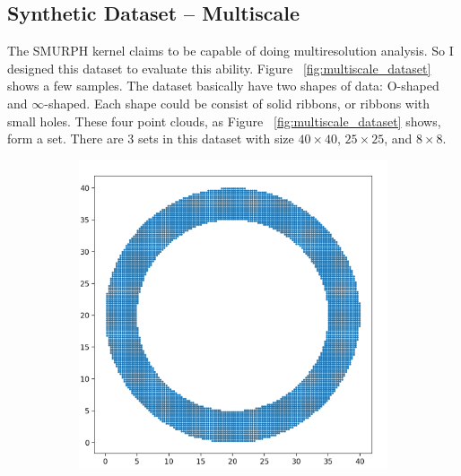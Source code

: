 \documentclass[10pt]{article}
\begin{document}
\subsection{Synthetic Dataset -- Multiscale}
The SMURPH kernel claims to be capable of doing multiresolution analysis.
So I designed this dataset to evaluate this ability.
Figure ~\ref{fig:multiscale_dataset} shows a few samples.
The dataset basically have two shapes of data: O-shaped and $\infty$-shaped.
Each shape could be consist of solid ribbons, or ribbons with small holes.
These four point clouds, as Figure ~\ref{fig:multiscale_dataset} shows, form a set.
There are 3 sets in this dataset with size $40 \times 40$, $25 \times 25$, and $8 \times 8$.

\begin{figure}[H]
    \centering
    \begin{subfigure}[h]{0.2\textwidth}
        \includegraphics[width=\linewidth]{ms_1}
    \end{subfigure}
    \begin{subfigure}[h]{0.2\textwidth}

\end{subfigure}
\end{figure}
\end{document}
